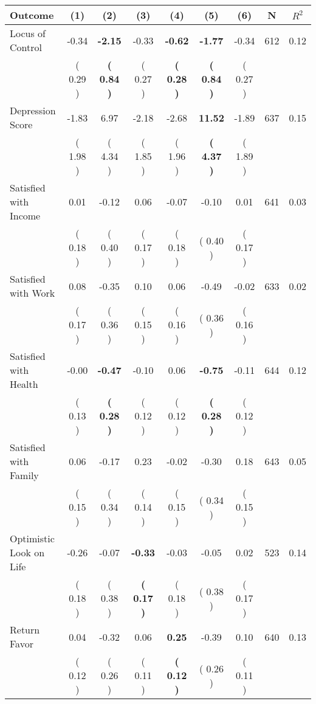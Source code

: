 \begin{tabular}{lcccccccc}
\toprule
 \textbf{Outcome} & \textbf{(1)} & \textbf{(2)} & \textbf{(3)} & \textbf{(4)} & \textbf{(5)} & \textbf{(6)} & \textbf{N} & \textbf{$ R^2$} \\
\midrule
Locus of Control &     -0.34 & \textbf{    -2.15} &     -0.33 & \textbf{    -0.62} & \textbf{    -1.77} &     -0.34 & 612 &       0.12 \\ 
 & (     0.29 ) & \textbf{(     0.84 )} & (     0.27 ) & \textbf{(     0.28 )} & \textbf{(     0.84 )} & (     0.27 ) & \\
Depression Score &     -1.83 &      6.97 &     -2.18 &     -2.68 & \textbf{    11.52} &     -1.89 & 637 &       0.15 \\ 
 & (     1.98 ) & (     4.34 ) & (     1.85 ) & (     1.96 ) & \textbf{(     4.37 )} & (     1.89 ) & \\
Satisfied with Income &      0.01 &     -0.12 &      0.06 &     -0.07 &     -0.10 &      0.01 & 641 &       0.03 \\ 
 & (     0.18 ) & (     0.40 ) & (     0.17 ) & (     0.18 ) & (     0.40 ) & (     0.17 ) & \\
Satisfied with Work &      0.08 &     -0.35 &      0.10 &      0.06 &     -0.49 &     -0.02 & 633 &       0.02 \\ 
 & (     0.17 ) & (     0.36 ) & (     0.15 ) & (     0.16 ) & (     0.36 ) & (     0.16 ) & \\
Satisfied with Health &     -0.00 & \textbf{    -0.47} &     -0.10 &      0.06 & \textbf{    -0.75} &     -0.11 & 644 &       0.12 \\ 
 & (     0.13 ) & \textbf{(     0.28 )} & (     0.12 ) & (     0.12 ) & \textbf{(     0.28 )} & (     0.12 ) & \\
Satisfied with Family &      0.06 &     -0.17 &      0.23 &     -0.02 &     -0.30 &      0.18 & 643 &       0.05 \\ 
 & (     0.15 ) & (     0.34 ) & (     0.14 ) & (     0.15 ) & (     0.34 ) & (     0.15 ) & \\
Optimistic Look on Life &     -0.26 &     -0.07 & \textbf{    -0.33} &     -0.03 &     -0.05 &      0.02 & 523 &       0.14 \\ 
 & (     0.18 ) & (     0.38 ) & \textbf{(     0.17 )} & (     0.18 ) & (     0.38 ) & (     0.17 ) & \\
Return Favor &      0.04 &     -0.32 &      0.06 & \textbf{     0.25} &     -0.39 &      0.10 & 640 &       0.13 \\ 
 & (     0.12 ) & (     0.26 ) & (     0.11 ) & \textbf{(     0.12 )} & (     0.26 ) & (     0.11 ) & \\

\end{tabular}
